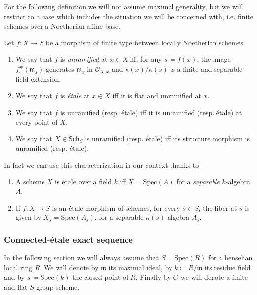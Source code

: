 \noindent
For the following definition we will not assume maximal generality, but
we will restrict to a case which includes the situation we will be concerned with,
i.e. finite schemes over a Noetherian affine base.
\begin{defn}\label{defn:EtaleMorphismSheaves}
	Let $f\colon X \to S$ be a morphism of finite type between
	locally Noetherian schemes.
\begin{enumerate}
	\item We say that $f$ is {\em unramified} at $x \in X$ iff, for any $s \coloneqq f(x)$,
		the image $f^{\#}_s(\mathfrak{m}_s)$ generates
		$\mathfrak{m}_x$ in $\mathcal{O}_{ X,x }$
		and $\kappa(x)/\kappa(s)$ is a finite and separable field extension.

	\item We say that $f$ is {\em étale} at $x \in X$ iff it is
		flat and unramified at $x$.

	\item We say that $f$ is unramified (resp$.$ étale) iff it is 
		unramified (resp$.$ étale) at every point of $X$.

	\item We say that $X \in \mathsf{Sch}_{ S }$ is unramified 
		(resp$.$ étale) iff its structure
		morphism is unramified (resp$.$ étale).
\end{enumerate}
\end{defn}


\noindent
In fact we can use this characterization in our context thanks to
\begin{lem}
	\leavevmode\vspace{-.2\baselineskip}
\begin{enumerate}
	\item A scheme $X$ is étale over a field $k$ iff $X = \mathrm{Spec}(A)$
		for a {\em separable} $k$-algebra $A$.
	\item If $f\colon X \to S$ is an étale morphism of schemes,
		for every $s \in S$, the fiber at $s$ is given by $X_s = \mathrm{Spec}(A_s)$,
		for a separable $\kappa(s)$-algebra $A_s$.
\end{enumerate}
\end{lem} 



\subsubsection{Connected-étale exact sequence}
In the following section we will always assume that 
$S = \mathrm{Spec}(R)$	for a henselian local ring $R$.
We will denote by $\mathfrak{m}$ its maximal ideal, by $k \coloneqq R/\mathfrak{m}$
its residue field and by $s \coloneqq \mathrm{Spec}(k)$ the closed point of $R$.
Finally by $G$ we will denote a finite and flat $S$-group scheme.


